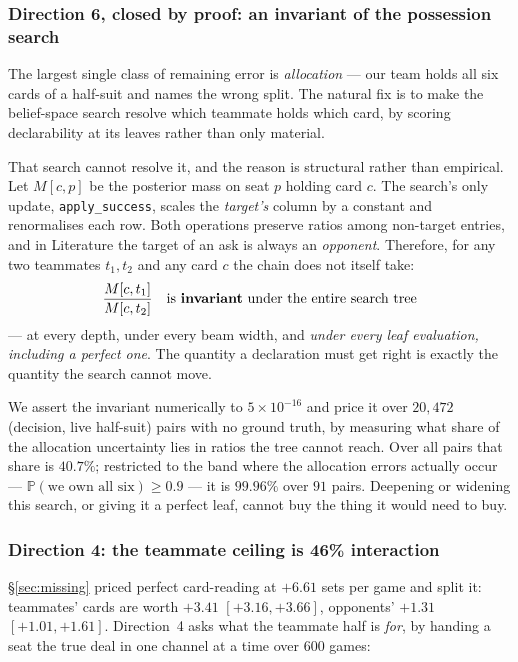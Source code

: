 \documentclass[11pt,letterpaper]{article}
\newcommand{\Prob}{\ensuremath{\mathbb{P}}}
\begin{document}
\subsubsection{Direction 6, closed by proof: an invariant of the possession search}
\label{sec:v11-theorem}

The largest single class of remaining error is \emph{allocation} --- our team
holds all six cards of a half-suit and names the wrong split. The natural fix
is to make the belief-space search resolve which teammate holds which card, by
scoring declarability at its leaves rather than only material.

That search cannot resolve it, and the reason is structural rather than
empirical. Let $M[c,p]$ be the posterior mass on seat $p$ holding card $c$. The
search's only update, \texttt{apply\_success}, scales the \emph{target's}
column by a constant and renormalises each row. Both operations preserve ratios
among non-target entries, and in Literature the target of an ask is always an
\emph{opponent}. Therefore, for any two teammates $t_1, t_2$ and any card $c$
the chain does not itself take:
\[
  \frac{M[c, t_1]}{M[c, t_2]} \quad\text{is \textbf{invariant} under the entire
  search tree}
\]
--- at every depth, under every beam width, and \emph{under every leaf
evaluation, including a perfect one}. The quantity a declaration must get right
is exactly the quantity the search cannot move.

We assert the invariant numerically to $5\times10^{-16}$ and price it over
$20{,}472$ (decision, live half-suit) pairs with no ground truth, by measuring
what share of the allocation uncertainty lies in ratios the tree cannot reach.
Over all pairs that share is $40.7\%$; restricted to the band where the
allocation errors actually occur --- $\Prob(\text{we own all six}) \ge 0.9$ ---
it is $\mathbf{99.96\%}$ over $91$ pairs. Deepening or widening this search, or
giving it a perfect leaf, cannot buy the thing it would need to buy.

\subsubsection{Direction 4: the teammate ceiling is 46\% interaction}

\S\ref{sec:missing} priced perfect card-reading at $+6.61$ sets per game and
split it: teammates' cards are worth $+3.41$ $[+3.16, +3.66]$, opponents'
$+1.31$ $[+1.01, +1.61]$. Direction~4 asks what the teammate half is
\emph{for}, by handing a seat the true deal in one channel at a time over
$600$ games:
\end{document}
